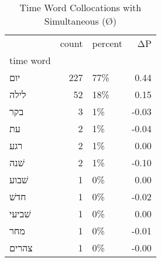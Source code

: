 \begin{table}[htbp!]
\centering
\caption{Time Word Collocations with Simultaneous (Ø)}
\label{table:simØ_head_cpd}
\begin{tabular}{lrlr}
\toprule
{} &  count & percent &    ΔP \\
time word &        &         &       \\
\midrule
יום       &    227 &     77\% &  0.44 \\
לילה      &     52 &     18\% &  0.15 \\
בקר       &      3 &      1\% & -0.03 \\
עת        &      2 &      1\% & -0.04 \\
רגע       &      2 &      1\% &  0.00 \\
שׁנה      &      2 &      1\% & -0.10 \\
שׁבוע     &      1 &      0\% &  0.00 \\
חדשׁ      &      1 &      0\% & -0.02 \\
שׁביעי    &      1 &      0\% &  0.00 \\
מחר       &      1 &      0\% & -0.01 \\
צהרים     &      1 &      0\% & -0.00 \\
\bottomrule
\end{tabular}
\end{table}
